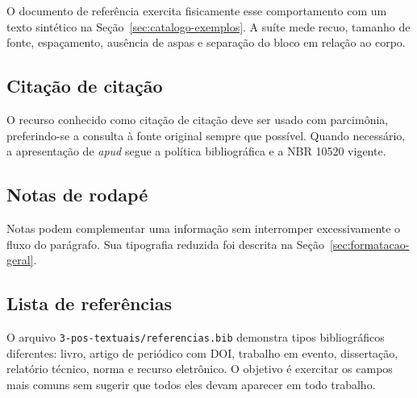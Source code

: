 O documento de referência exercita fisicamente esse comportamento com um texto sintético na Seção~\ref{sec:catalogo-exemplos}. A suíte mede recuo, tamanho de fonte, espaçamento, ausência de aspas e separação do bloco em relação ao corpo.

\subsection{Citação de citação}

O recurso conhecido como citação de citação deve ser usado com parcimônia, preferindo-se a consulta à fonte original sempre que possível. Quando necessário, a apresentação de \textit{apud} segue a política bibliográfica e a NBR 10520 vigente.


\subsection{Notas de rodapé}

Notas podem complementar uma informação sem interromper excessivamente o fluxo do parágrafo. Sua tipografia reduzida foi descrita na Seção~\ref{sec:formatacao-geral}.


\subsection{Lista de referências}


O arquivo \texttt{3-pos-textuais/referencias.bib} demonstra tipos bibliográficos diferentes: livro, artigo de periódico com DOI, trabalho em evento, dissertação, relatório técnico, norma e recurso eletrônico. O objetivo é exercitar os campos mais comuns sem sugerir que todos eles devam aparecer em todo trabalho.

